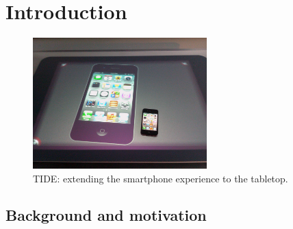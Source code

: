 

%

\chapter{Introduction}
\label{introduction}

\begin{figure}[b!]
  \centering
    \includegraphics[width=0.6\textwidth]{images/tide}
  \caption{TIDE: extending the smartphone experience to the tabletop.}
  \label{tide}
\end{figure}

\section{Background and motivation}

